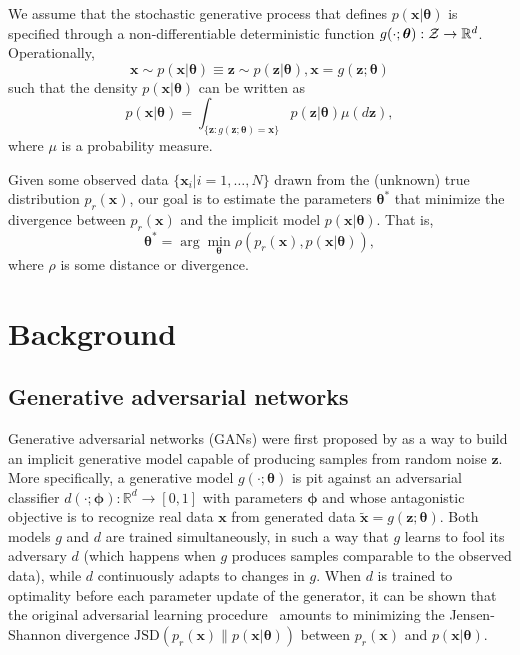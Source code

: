 \documentclass[twocolumn,superscriptaddress,aps]{revtex4-1}
\newcommand{\bftheta}{{\bm \theta}}
\newcommand{\bfphi}{{\bm \phi}}
\newcommand{\bfx}{\mathbf{x}}
\newcommand{\bfz}{\mathbf{z}}
\theoremstyle{plain}
\begin{document}
We assume that the stochastic generative process that defines $p(\mathbf{x}|\bftheta)$ is
specified through a non-differentiable deterministic function $g(\cdot; \bftheta) : {\cal Z} \to
\mathbb{R}^d$. Operationally, %
\begin{equation}\label{eqn:p_theta}
    \mathbf{x} \sim p(\mathbf{x}|\bftheta) \equiv \bfz \sim p(\bfz|\bftheta), \mathbf{x} = g(\bfz; \bftheta)
\end{equation}
such that the density $p(\mathbf{x}|\bftheta)$ can be
written as
\begin{equation}\label{eqn:p_x_sim}
    p(\mathbf{x}|\bftheta) = \int_{\{\bfz:g(\bfz;\bftheta) = \bfx \}} p(\bfz|\bftheta) \mu(d\bfz),
\end{equation}
where $\mu$ is a probability measure.

Given some observed data $\{ \mathbf{x}_i | i=1, \dots, N \}$ drawn from the
(unknown) true distribution $p_r(\mathbf{x})$, our goal is to estimate the parameters
$\bftheta^*$ that minimize the divergence between $p_r(\mathbf{x})$ and
the implicit model $p(\mathbf{x}|\bftheta)$. That is,
\begin{equation}
    \bftheta^* = \arg \min_{\bftheta} \rho(p_r(\mathbf{x}), p(\mathbf{x}|\bftheta)),
\end{equation}
where $\rho$ is some distance or divergence.



\section{Background}

\subsection{Generative adversarial networks}
\label{sec:gans}

Generative adversarial networks (GANs) were first proposed by
\cite{goodfellow2014generative} as a way to build an implicit generative model
capable of producing samples from random noise $\bfz$. More specifically,
a generative model $g(\cdot; \bftheta)$ is pit against an adversarial
classifier $d(\cdot; \bfphi):\mathbb{R}^d \to [0,1]$ with parameters $\bfphi$ and whose antagonistic objective is to recognize real data $\mathbf{x}$
from generated data $\tilde{\mathbf{x}} = g(\bfz; \bftheta)$. Both models $g$ and $d$
are trained simultaneously, in such a way that $g$ learns to fool
its adversary $d$ (which happens when $g$ produces samples comparable to the
observed data), while $d$ continuously adapts to changes in $g$. When $d$ is
trained to optimality before each parameter update of the generator, it can
be shown that the original adversarial learning procedure~\cite{goodfellow2014generative} amounts to minimizing
the Jensen-Shannon divergence $\text{JSD}(p_r(\mathbf{x}) \parallel p(\mathbf{x}|\bftheta))$ between $p_r(\mathbf{x})$ and $p(\mathbf{x}|\bftheta)$.
\end{document}
